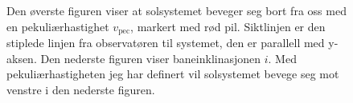 \documentclass[reprint, english,notitlepage]{revtex4-1}  %
\begin{document}
\begin{figure}
  \caption{Den øverste figuren viser at solsystemet beveger seg bort fra oss med en pekuliærhastighet $v_{\text{pec}}$, markert med rød pil. Siktlinjen er den stiplede linjen fra observatøren til systemet, den er parallell med y-aksen. Den nederste figuren viser baneinklinasjonen $i$. Med pekuliærhastigheten jeg har definert vil solsystemet bevege seg mot venstre i den nederste figuren.}
  \label{fig:line_of_sight}
\end{figure}
\end{document}
